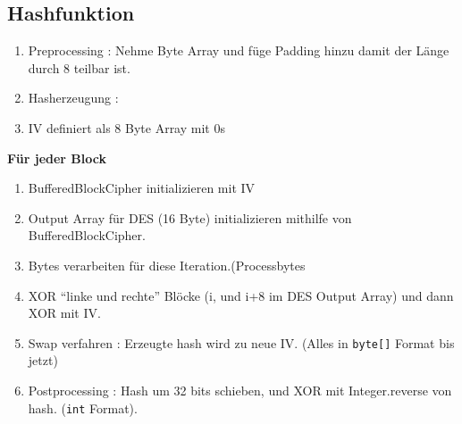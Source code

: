 \documentclass{beamer}
\begin{document}
\begin{frame}
\section{Hashfunktion}
\begin{enumerate}
 \item Preprocessing : Nehme Byte Array und füge Padding hinzu damit der Länge durch 8 teilbar ist.
 \item Hasherzeugung :
 \item IV definiert als 8 Byte Array mit 0s
\end{enumerate}
\textbf{Für jeder Block}
\begin{enumerate}
 \item BufferedBlockCipher initializieren mit IV
 \item Output Array für DES (16 Byte) initializieren mithilfe von BufferedBlockCipher.
 \item Bytes verarbeiten für diese Iteration.(Processbytes
 \item XOR ``linke und rechte'' Blöcke (i, und i+8 im DES Output Array) und dann XOR mit IV.
 \item Swap verfahren : Erzeugte hash wird zu neue IV. (Alles in \texttt{byte[]} Format bis jetzt)
 \item Postprocessing : Hash um 32 bits schieben, und XOR mit Integer.reverse von hash. (\texttt{int} Format).
\end{enumerate}
\end{frame}
\end{document}
